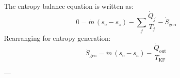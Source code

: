 The entropy balance equation is written as:  
\[
0 = \dot{m} \, (s_{\text{e}} - s_{\text{a}}) - \sum_j \frac{\dot{Q}_j}{T_j} - \dot{S}_{\text{gen}}
\]  
Rearranging for entropy generation:  
\[
\dot{S}_{\text{gen}} = \dot{m} \, (s_{\text{e}} - s_{\text{a}}) - \frac{\dot{Q}_{\text{out}}}{T_{\text{KF}}}
\]  

---